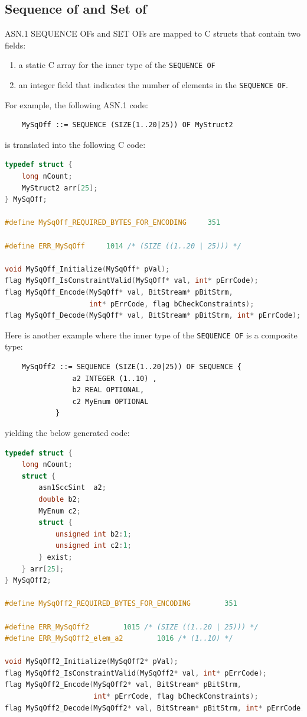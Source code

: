 \documentclass[11pt]{book}
\begin{document}
      \subsection{Sequence of and Set of}
      ASN.1 SEQUENCE OFs and SET OFs are mapped to C structs that contain 
      two fields: 
      \begin{enumerate}
         \item
            a static C array for the inner type of the \texttt{SEQUENCE OF}
         \item
            an integer field that indicates the number of elements 
            in the \texttt{SEQUENCE OF}.
      \end{enumerate}

      For example, the following ASN.1 code:

\begin{lstlisting}
	MySqOff ::= SEQUENCE (SIZE(1..20|25)) OF MyStruct2
\end{lstlisting}

      is translated into the following C code:

\begin{lstlisting}[language=c]
typedef struct {
    long nCount;
    MyStruct2 arr[25];
} MySqOff;

#define MySqOff_REQUIRED_BYTES_FOR_ENCODING		351

#define ERR_MySqOff		1014 /* (SIZE ((1..20 | 25))) */

void MySqOff_Initialize(MySqOff* pVal);
flag MySqOff_IsConstraintValid(MySqOff* val, int* pErrCode);
flag MySqOff_Encode(MySqOff* val, BitStream* pBitStrm, 
                    int* pErrCode, flag bCheckConstraints);
flag MySqOff_Decode(MySqOff* val, BitStream* pBitStrm, int* pErrCode);
\end{lstlisting}

      Here is another example where the inner type of the \texttt{SEQUENCE OF} is a composite type:

\begin{lstlisting}
	MySqOff2 ::= SEQUENCE (SIZE(1..20|25)) OF SEQUENCE {
				a2 INTEGER (1..10) ,
				b2 REAL OPTIONAL,
				c2 MyEnum OPTIONAL
			}
\end{lstlisting}

      yielding the below generated code:

\begin{lstlisting}[language=c]
typedef struct {
    long nCount;
    struct {
        asn1SccSint  a2;
        double b2;
        MyEnum c2;
        struct {
            unsigned int b2:1;
            unsigned int c2:1;
        } exist;
    } arr[25];
} MySqOff2;

#define MySqOff2_REQUIRED_BYTES_FOR_ENCODING		351

#define ERR_MySqOff2		1015 /* (SIZE ((1..20 | 25))) */
#define ERR_MySqOff2_elem_a2		1016 /* (1..10) */

void MySqOff2_Initialize(MySqOff2* pVal);
flag MySqOff2_IsConstraintValid(MySqOff2* val, int* pErrCode);
flag MySqOff2_Encode(MySqOff2* val, BitStream* pBitStrm, 
                     int* pErrCode, flag bCheckConstraints);
flag MySqOff2_Decode(MySqOff2* val, BitStream* pBitStrm, int* pErrCode);
\end{lstlisting}
\end{document}
